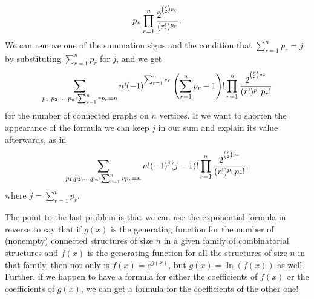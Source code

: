 \begin{enumerate}
{$${p_n}
\prod_{r=1}^n{2^{^{{r\choose 2}p_r}}
\over (r!)^{p_r}}.$$  We can remove one of the summation signs and the
condition that $\sum_{r=1}^n p_r=j$ by substituting $\sum_{r=1}^n p_r$
for $j$, and we get
$$\sum_{{p_1,p_2,\ldots,p_n: \sum_{r=1}^n
rp_r =n }}{n!}(-1)^{^{\sum_{r=1}^n p_r}}\left(\sum_{r=1}^n p_r -1\right)!
\prod_{r=1}^n{2^{^{{r\choose 2}p_r}}
\over (r!)^{p_r}p_r!}$$
for the number of connected graphs on $n$ vertices.  If we want to
shorten the appearance of the formula we can keep $j$ in our sum and
explain its value afterwards, as in
$$\sum_{{p_1,p_2,\ldots,p_n: \sum_{r=1}^n
rp_r =n }}{n!}(-1)^j(j-1)!
\prod_{r=1}^n{2^{^{{r\choose 2}p_r}}
\over (r!)^{p_r}p_r!},$$
where $j=\sum_{r=1}^n p_r$.
}
\end{enumerate}
\ep

The point to the last problem is that we can use the exponential formula
in reverse to say that if $g(x)$ is the generating function for the
number of (nonempty) connected structures of size $n$ in a given family of
combinatorial structures and $f(x)$ is the generating function for all
the structures of size $n$ in that family, then not only is $f(x) =
e^{g(x)}$, but $g(x) = \ln(f(x))$ as well.  Further, if we happen to have
a formula for either the coefficients of $f(x)$ or the coefficients of
$g(x)$, we can get a formula for the coefficients of the other one!


